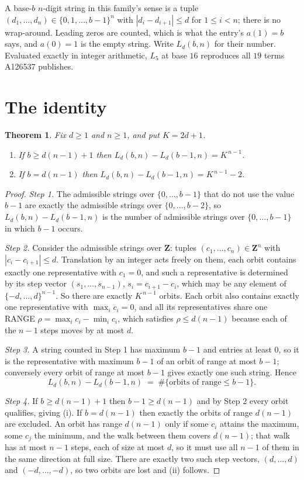 \documentclass[11pt,a4paper]{article}
\theoremstyle{plain}
\newtheorem{theorem}{Theorem}
\theoremstyle{definition}
\begin{document}
A base-$b$ $n$-digit string in this family's sense is a tuple
$(d_1,\dots,d_n)\in\{0,1,\dots,b-1\}^{n}$ with $|d_i-d_{i+1}|\le d$ for $1\le i<n$; there
is no wrap-around. Leading zeros are counted, which is what the entry's $a(1)=b$ says, and
$a(0)=1$ is the empty string. Write $L_d(b,n)$ for their number. Evaluated exactly in integer
arithmetic, $L_{5}$ at base $16$ reproduces all $19$ terms A126537 publishes.

\section{The identity}

\begin{theorem}
Fix $d\ge1$ and $n\ge1$, and put $K=2d+1$.
\begin{enumerate}
\item[(i)] If $b\ge d(n-1)+1$ then $L_d(b,n)-L_d(b-1,n)=K^{\,n-1}$.
\item[(ii)] If $b=d(n-1)$ then $L_d(b,n)-L_d(b-1,n)=K^{\,n-1}-2$.
\end{enumerate}
\end{theorem}

\begin{proof}
\emph{Step 1.} The admissible strings over $\{0,\dots,b-1\}$ that do not use the value $b-1$
are exactly the admissible strings over $\{0,\dots,b-2\}$, so $L_d(b,n)-L_d(b-1,n)$ is the
number of admissible strings over $\{0,\dots,b-1\}$ in which $b-1$ occurs.

\emph{Step 2.} Consider the admissible strings over $\mathbf{Z}$: tuples
$(c_1,\dots,c_n)\in\mathbf{Z}^{n}$ with $|c_i-c_{i+1}|\le d$. Translation by an integer acts
freely on them, each orbit contains exactly one representative with $c_1=0$, and such a
representative is determined by its step vector $(s_1,\dots,s_{n-1})$, $s_i=c_{i+1}-c_i$,
which may be any element of $\{-d,\dots,d\}^{n-1}$. So there are exactly $K^{\,n-1}$ orbits.
Each orbit also contains exactly one representative with $\max_i c_i=0$, and all its
representatives share one RANGE $\rho=\max_ic_i-\min_ic_i$, which satisfies
$\rho\le d(n-1)$ because each of the $n-1$ steps moves by at most $d$.

\emph{Step 3.} A string counted in Step 1 has maximum $b-1$ and entries at least $0$, so it is
the representative with maximum $b-1$ of an orbit of range at most $b-1$; conversely every orbit
of range at most $b-1$ gives exactly one such string. Hence
\[
L_d(b,n)-L_d(b-1,n)\;=\;\#\{\text{orbits of range}\le b-1\} .
\]

\emph{Step 4.} If $b\ge d(n-1)+1$ then $b-1\ge d(n-1)$ and by Step 2 every orbit qualifies,
giving (i). If $b=d(n-1)$ then exactly the orbits of range $d(n-1)$ are excluded. An orbit has
range $d(n-1)$ only if some $c_i$ attains the maximum, some $c_j$ the minimum, and the walk
between them covers $d(n-1)$; that walk has at most $n-1$ steps, each of size at most $d$, so it
must use all $n-1$ of them in the same direction at full size. There are exactly two such step
vectors, $(d,\dots,d)$ and $(-d,\dots,-d)$, so two orbits are lost and (ii) follows.
\end{proof}
\end{document}
